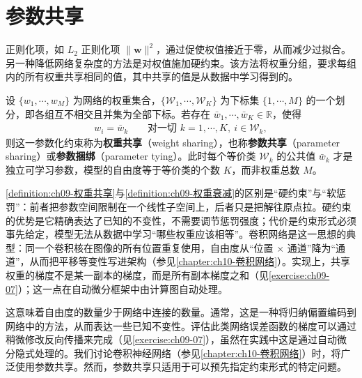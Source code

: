 \documentclass[../../main.tex]{subfiles}
\begin{document}
\section{参数共享}\label{section:ch09-参数共享}

正则化项，如 $L_{2}$ 正则化项 $\|\boldsymbol{w}\|^{2}$，通过促使权值接近于零，从而减少过拟合。另一种降低网络复杂度的方法是对权值施加硬约束。该方法将权重分组，要求每组内的所有权重共享相同的值，其中共享的值是从数据中学习得到的。

\begin{definition}[权重共享]\label{definition:ch09-权重共享}
设 $\{w_{1},\cdots,w_{M}\}$ 为网络的权重集合，$\{\mathcal{W}_{1},\cdots,\mathcal{W}_{K}\}$ 为下标集 $\{1,\cdots,M\}$ 的一个划分，即各组互不相交且并集为全部下标。若存在 $\bar{w}_{1},\cdots,\bar{w}_{K}\in\mathbb{R}$，使得
\begin{align*}
w_{i}=\bar{w}_{k}\qquad\text{对一切 }k=1,\cdots,K,\ i\in\mathcal{W}_{k},
\end{align*}
则这一参数化约束称为\textbf{权重共享}（weight sharing），也称\textbf{参数共享}（parameter sharing）或\textbf{参数捆绑}（parameter tying）。此时每个等价类 $\mathcal{W}_{k}$ 的公共值 $\bar{w}_{k}$ 才是独立可学习参数，模型的自由度等于等价类的个数 $K$，而非权重总数 $M$。
\end{definition}

\begin{remark}\cref{definition:ch09-权重共享}与\cref{definition:ch09-权重衰减}的区别是“硬约束”与“软惩罚”：前者把参数空间限制在一个线性子空间上，后者只是把解往原点拉。硬约束的优势是它精确表达了已知的不变性，不需要调节惩罚强度；代价是约束形式必须事先给定，模型无法从数据中学习“哪些权重应该相等”。卷积网络是这一思想的典型：同一个卷积核在图像的所有位置重复使用，自由度从“位置 $\times$ 通道”降为“通道”，从而把平移等变性写进架构（参见\cref{chapter:ch10-卷积网络}）。实现上，共享权重的梯度不是某一副本的梯度，而是所有副本梯度之和（见\cref{exercise:ch09-07}）；这一点在自动微分框架中由计算图自动处理。
\end{remark}

这意味着自由度的数量少于网络中连接的数量。通常，这是一种将归纳偏置编码到网络中的方法，从而表达一些已知不变性。评估此类网络误差函数的梯度可以通过稍微修改反向传播来完成（见\cref{exercise:ch09-07}），虽然在实践中这是通过自动微分隐式处理的。我们讨论卷积神经网络（参见\cref{chapter:ch10-卷积网络}）时，将广泛使用参数共享。然而，参数共享只适用于可以预先指定约束形式的特定问题。
\end{document}

